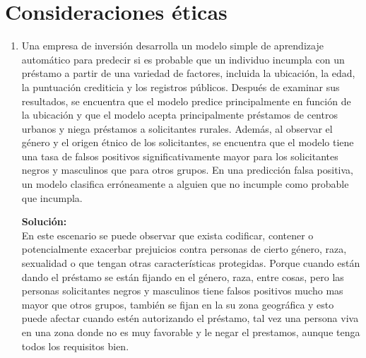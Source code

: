 \documentclass[11pt,letterpaper]{article}
\newenvironment{solution}{%
  \noindent\begin{shaded}
  \textbf{Solución:}\ }{
  \end{shaded}%
}
\begin{document}

\section*{Consideraciones éticas}

\begin{enumerate}
\item%
  Una empresa de inversión desarrolla un modelo simple de aprendizaje
  automático para predecir si es probable que un individuo incumpla
  con un préstamo a partir de una variedad de factores, incluida la
  ubicación, la edad, la puntuación crediticia y los registros
  públicos.  Después de examinar sus resultados, se encuentra que el
  modelo predice principalmente en función de la ubicación y que el
  modelo acepta principalmente préstamos de centros urbanos y niega
  préstamos a solicitantes rurales.  Además, al observar el género y
  el origen étnico de los solicitantes, se encuentra que el modelo
  tiene una tasa de falsos positivos significativamente mayor para los
  solicitantes negros y masculinos que para otros grupos.  En una
  predicción falsa positiva, un modelo clasifica erróneamente a
  alguien que no incumple como probable que incumpla.
  \begin{solution}
    \\En este escenario se puede observar que exista codificar, contener o potencialmente exacerbar prejuicios contra personas de cierto género, raza, sexualidad o que tengan otras características protegidas. Porque cuando están dando el préstamo se están fijando en el género, raza, entre cosas, pero las personas solicitantes negros y masculinos tiene falsos positivos mucho mas mayor que otros grupos, también se fijan en la su zona geográfica y esto puede afectar cuando estén autorizando el préstamo, tal vez una persona viva en una zona donde no es muy favorable y le negar el prestamos, aunque tenga todos los requisitos bien.


\end{solution}
\end{enumerate}
\end{document}
